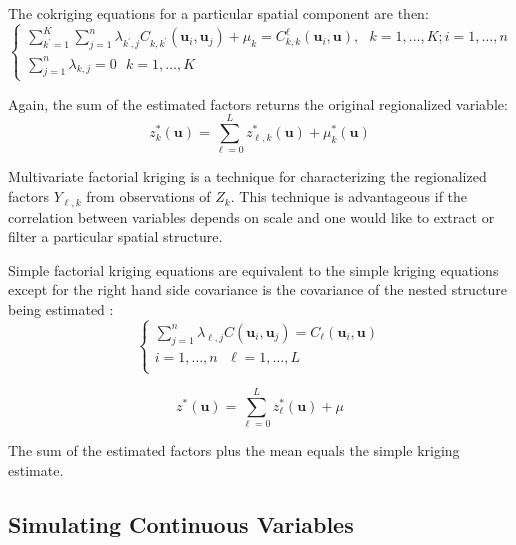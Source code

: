 The cokriging equations for a particular spatial component are then:
\begin{equation*}
    \begin{cases}
        \sum_{k^{\prime}=1}^{K} \sum_{j=1}^{n} \lambda_{k^{\prime},j} C_{k,k^{\prime}}(\mathbf{u}_{i}, \mathbf{u}_{j}) + \mu_{k} = C_{k,k}^{\ell}(\mathbf{u}_{i},\mathbf{u}), \ \ \ k=1,\dots,K; i=1,\dots,n \\
        \sum_{j=1}^{n} \lambda_{k,j} = 0  \ \ \ k=1,\dots,K
    \end{cases}
\end{equation*}

Again, the sum of the estimated factors returns the original regionalized variable:
\begin{equation*}
    z^{*}_{k}(\mathbf{u}) = \sum_{\ell=0}^{L} z^{*}_{\ell, k}(\mathbf{u}) + \mu^{*}_{k}(\mathbf{u})
\end{equation*}

Multivariate factorial kriging is a technique for characterizing the regionalized factors $Y_{\ell, k}$ from observations of $Z_{k}$. This technique is advantageous if the correlation between variables depends on scale and one would like to extract or filter a particular spatial structure.

Simple factorial kriging equations are equivalent to the simple kriging equations except for the right hand side covariance is the covariance of the nested structure being estimated \citep{hong2007improved}:
\begin{equation*}
    \begin{cases}
        \sum_{j=1}^{n} \lambda_{\ell,j} C(\mathbf{u}_{i}, \mathbf{u}_{j}) = C_{\ell}(\mathbf{u}_{i}, \mathbf{u}) \\
        i=1,\dots,n \ \ \ \ell=1,\dots,L                                                                         \\
    \end{cases}
\end{equation*}

\begin{equation*}
    z^{*}(\mathbf{u}) = \sum_{\ell=0}^{L} z_{\ell}^{*}(\mathbf{u}) + \mu
\end{equation*}

The sum of the estimated factors plus the mean equals the simple kriging estimate.

\subsection{Simulating Continuous Variables}
\label{subsec:01simulate}

